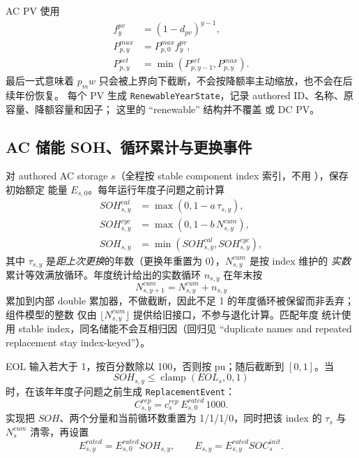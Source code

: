 AC PV 使用
\begin{align}
 f_y^{pv}&=(1-d_{pv})^{y-1},\\
 P_{p,y}^{max}&=P_{p,0}^{max}f_y^{pv},\\
 P_{p,y}^{set}&=\min(P_{p,y-1}^{set},P_{p,y}^{max}).
\end{align}
最后一式意味着 $p_mw$ 只会被上界向下截断，不会按降额率主动缩放，也不会在后续年份恢复。
每个 PV 生成 \texttt{RenewableYearState}，记录 authored ID、名称、原容量、降额容量和因子；
这里的 ``renewable'' 结构并不覆盖  或 DC PV。

\subsection{AC 储能 SOH、循环累计与更换事件}
对 authored AC storage $s$（全程按 stable component index 索引，不用 ），保存初始额定
能量 $E_{s,0}$。每年运行年度子问题之前计算
\begin{align}
 SOH^{cal}_{s,y}&=\max(0,1-a\,\tau_{s,y}),\\
 SOH^{cyc}_{s,y}&=\max(0,1-b\,N^{cum}_{s,y}),\\
 SOH_{s,y}&=\min(SOH^{cal}_{s,y},SOH^{cyc}_{s,y}),
\end{align}
其中 $\tau_{s,y}$ 是\emph{距上次更换}的年数（更换年重置为 0），$N^{cum}_{s,y}$ 是按 index 维护的
\emph{实数}累计等效满放循环。年度统计给出的实数循环 $n_{s,y}$ 在年末按
\begin{equation}
 N^{cum}_{s,y+1}=N^{cum}_{s,y}+n_{s,y}
\end{equation}
累加到内部 double 累加器，不做截断，因此不足 1 的年度循环被保留而非丢弃；组件模型的整数
 仅由 $\lfloor N^{cum}_{s,y}\rfloor$ 提供给旧接口，不参与退化计算。匹配年度
统计使用 stable index，同名储能不会互相归因（回归见 
“duplicate names and repeated replacement stay index-keyed”）。

EOL 输入若大于 1，按百分数除以 100，否则按 pu；随后截断到 $[0,1]$。当
\begin{equation}
 SOH_{s,y}\le \operatorname{clamp}(EOL_s,0,1)
\end{equation}
时，在该年年度子问题之前生成 \texttt{ReplacementEvent}：
\begin{equation}
 C^{rep}_{s,y}=c_s^{rep}\,E_{s,0}^{rated}\,1000.
\end{equation}
实现把 $SOH$、两个分量和当前循环数重置为 1/1/1/0，同时把该 index 的 $\tau_s$ 与 $N^{cum}_s$
清零，再设置
\begin{equation}
 E_{s,y}^{rated}=E_{s,0}^{rated}SOH_{s,y},\qquad
 E_{s,y}=E_{s,y}^{rated}SOC_s^{init}.
\end{equation}

